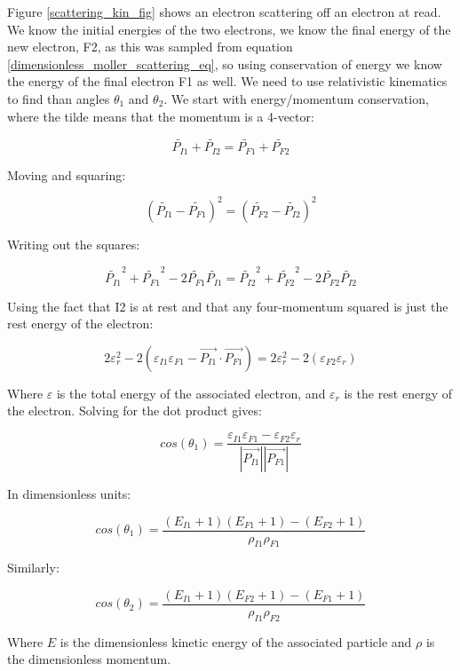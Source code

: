 \documentclass[]{article}
\begin{document}
Figure \ref{scattering_kin_fig} shows an electron scattering off an electron at read. We know the initial energies of the two electrons, we know the final energy of the new electron, F2, as this was sampled from equation \ref{dimensionless_moller_scattering_eq}, so using conservation of energy we know the energy of the final electron F1 as well. We need to use relativistic kinematics to find than angles $\theta_1$ and $\theta_2$. We start with energy/momentum conservation, where the tilde means that the momentum is a 4-vector:

\[ 
\tilde{P_{I1}}+\tilde{P_{I2}}=\tilde{P_{F1}}+\tilde{P_{F2}}
\]

Moving and squaring:

\[ 
(\tilde{P_{I1}}-\tilde{P_{F1}})^2=(\tilde{P_{F2}}-\tilde{P_{I2}})^2
\]

Writing out the squares:

\[ 
\tilde{P_{I1}}^2 + \tilde{P_{F1}}^2 - 2\tilde{P_{F1}}\tilde{P_{I1}}=\tilde{P_{I2}}^2 + \tilde{P_{F2}}^2 - 2\tilde{P_{F2}}\tilde{P_{I2}}
\]

Using the fact that I2 is at rest and that any four-momentum squared is just the rest energy of the electron:

\[ 
2\varepsilon_r^2 - 2(\varepsilon_{I1}\varepsilon_{F1}- \vec{P_{I1}}\cdot\vec{P_{F1}})=2\varepsilon_r^2 - 2(\varepsilon_{F2}\varepsilon_r)
\] 

Where $\varepsilon$ is the total energy of the associated electron, and $\varepsilon_r$ is the rest energy of the electron. Solving for the dot product gives:

\[ 
cos(\theta_1)=\frac{\varepsilon_{I1}\varepsilon_{F1}-\varepsilon_{F2}\varepsilon_r}{ \left| \vec{P_{I1}} \right| \left| \vec{P_{F1}} \right|  }
 \]
 
In dimensionless units:

\begin{equation}
cos(\theta_1)=\frac{(E_{I1}+1)(E_{F1}+1)-(E_{F2}+1)}{\rho_{I1}\rho_{F1}}
\end{equation}

Similarly:

\begin{equation}
cos(\theta_2)=\frac{(E_{I1}+1)(E_{F2}+1)-(E_{F1}+1)}{\rho_{I1}\rho_{F2}}
\end{equation}

Where $E$ is the dimensionless kinetic energy of the associated particle and $\rho$ is the dimensionless momentum.
\end{document}

